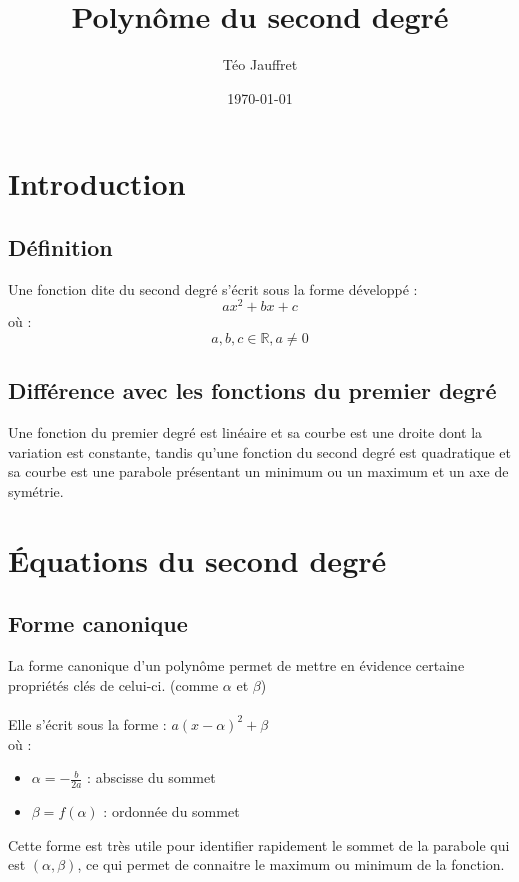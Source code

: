 \documentclass{article}
\title{Polynôme du second degré}
\author{Téo Jauffret}
\date{\today}
\begin{document}
	\maketitle
	\tableofcontents
	\newpage
	
	\section{Introduction}
	\subsection{Définition}
	Une fonction dite du second degré s'écrit sous la forme développé : 
	\[
	ax^2 + bx + c
	\]
	où : $$a, b, c \in \mathbb{R}, a \neq 0$$
	
	\subsection{Différence avec les fonctions du premier degré}
	Une fonction du premier degré est linéaire et sa courbe est une droite dont la variation est constante, tandis qu'une fonction du second degré est quadratique et sa courbe est une parabole présentant un minimum ou un maximum et un axe de symétrie.
	
	\section{Équations du second degré}
	\subsection{Forme canonique}
	La forme canonique d'un polynôme permet de mettre en évidence certaine propriétés clés de celui-ci. (comme $\alpha$ et $\beta$)\\\\
	Elle s'écrit sous la forme : $a(x - \alpha)^2 + \beta$\\
	où :
	\begin{itemize}
		\item $\alpha = -\frac{b}{2a}$ : abscisse du sommet
		\item $\beta = f(\alpha)$ : ordonnée du sommet\\
	\end{itemize}
	
	Cette forme est très utile pour identifier rapidement le sommet de la parabole qui est $(\alpha, \beta)$, ce qui permet de connaitre le maximum ou minimum de la fonction.\\
	
\end{document}
